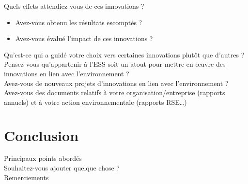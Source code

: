 Quels effets attendiez-vous de ces innovations ?
    \begin{itemize}
        \item Avez-vous obtenu les résultats escomptés ? 
        \item Avez-vous évalué l’impact de ces innovations ? \\
    \end{itemize}
	
	

Qu’est-ce qui a guidé votre choix vers certaines innovations plutôt que d’autres ? \\ 

Pensez-vous qu’appartenir à l’ESS soit un atout pour mettre en œuvre des innovations en lien avec l’environnement ? \\

Avez-vous de nouveaux projets d’innovations en lien avec l’environnement ?  \\

Avez-vous des documents relatifs à votre organisation/entreprise (rapports annuels) et à votre action environnementale (rapports RSE…) \\

\section*{Conclusion}
Principaux points abordés \\

Souhaitez-vous ajouter quelque chose ? \\

Remerciements 
